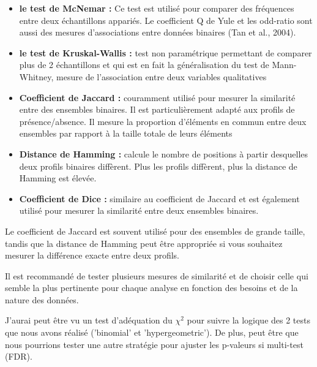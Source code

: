 \documentclass[a4paper,11pt,openright]{report}
\begin{document}
\begin{itemize}
\item \textbf{le test de McNemar : } Ce test est utilisé pour comparer des fréquences entre deux échantillons appariés. Le coefficient Q de Yule et les odd-ratio sont aussi des mesures d’associations entre données binaires (Tan et al., 2004).

\item \textbf{le test de Kruskal-Wallis : } test non paramétrique permettant de comparer plus de 2 échantillons et qui est en fait la généralisation du test de Mann-Whitney, mesure de l’association entre deux variables qualitatives 

\item \textbf{Coefficient de Jaccard : } couramment utilisé pour mesurer la similarité entre des ensembles binaires. Il est particulièrement adapté aux profils de présence/absence. Il mesure la proportion d'éléments en commun entre deux ensembles par rapport à la taille totale de leurs éléments

\item \textbf{Distance de Hamming : } calcule le nombre de positions à partir desquelles deux profils binaires diffèrent. Plus les profils diffèrent, plus la distance de Hamming est élevée.

\item \textbf{Coefficient de Dice : } similaire au coefficient de Jaccard et est également utilisé pour mesurer la similarité entre deux ensembles binaires. 
\end{itemize}

Le coefficient de Jaccard est souvent utilisé pour des ensembles de grande taille, tandis que la distance de Hamming peut être appropriée si vous souhaitez mesurer la différence exacte entre deux profils. 

Il est recommandé de tester plusieurs mesures de similarité et de choisir celle qui semble la plus pertinente pour chaque analyse en fonction des besoins et de la nature des données.


J'aurai peut être vu un test d'adéquation du  $\chi^2$ pour suivre la logique des 2 tests que nous avons réalisé ('binomial' et 'hypergeometric'). De plus, peut être que nous pourrions tester une autre stratégie pour ajuster les p-valeurs si multi-test (FDR).
\end{document}

